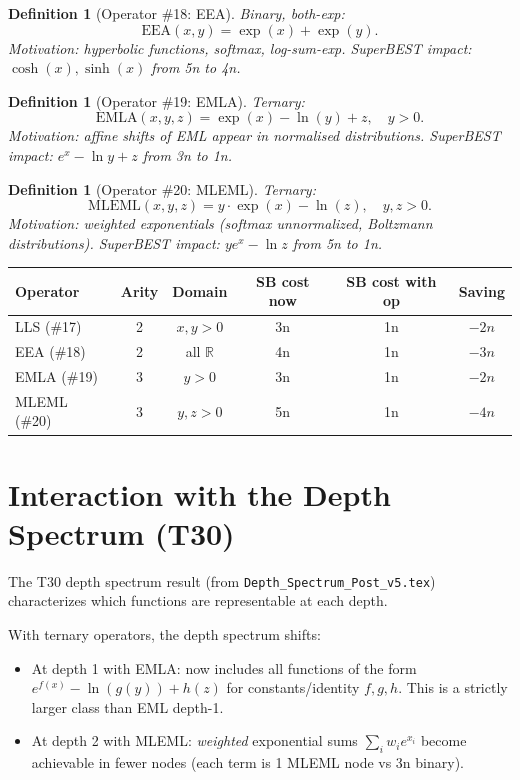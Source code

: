 \documentclass[11pt]{article}
\newtheorem{definition}[theorem]{Definition}
\begin{document}
\begin{definition}[Operator \#18: EEA]
Binary, both-exp:
\[
  \mathrm{EEA}(x,y) = \exp(x) + \exp(y).
\]
Motivation: hyperbolic functions, softmax, log-sum-exp.
SuperBEST impact: $\cosh(x), \sinh(x)$ from 5n to 4n.
\end{definition}

\begin{definition}[Operator \#19: EMLA]
Ternary:
\[
  \mathrm{EMLA}(x,y,z) = \exp(x) - \ln(y) + z, \quad y > 0.
\]
Motivation: affine shifts of EML appear in normalised distributions.
SuperBEST impact: $e^x - \ln y + z$ from 3n to 1n.
\end{definition}

\begin{definition}[Operator \#20: MLEML]
Ternary:
\[
  \mathrm{MLEML}(x,y,z) = y \cdot \exp(x) - \ln(z), \quad y,z > 0.
\]
Motivation: weighted exponentials (softmax unnormalized, Boltzmann distributions).
SuperBEST impact: $y e^x - \ln z$ from 5n to 1n.
\end{definition}

\begin{center}
\begin{tabular}{lccccc}
\toprule
Operator & Arity & Domain & SB cost now & SB cost with op & Saving \\
\midrule
LLS (\#17)   & 2 & $x,y>0$ & 3n & 1n & $-2n$ \\
EEA (\#18)   & 2 & all $\mathbb{R}$ & 4n & 1n & $-3n$ \\
EMLA (\#19)  & 3 & $y>0$ & 3n & 1n & $-2n$ \\
MLEML (\#20) & 3 & $y,z>0$ & 5n & 1n & $-4n$ \\
\bottomrule
\end{tabular}
\end{center}

\section{Interaction with the Depth Spectrum (T30)}
\label{sec:t30}

The T30 depth spectrum result (from \texttt{Depth\_Spectrum\_Post\_v5.tex})
characterizes which functions are representable at each depth.

With ternary operators, the depth spectrum shifts:
\begin{itemize}
  \item At depth 1 with EMLA: now includes all functions of the form
        $e^{f(x)} - \ln(g(y)) + h(z)$ for constants/identity $f,g,h$.
        This is a strictly larger class than EML depth-1.
  \item At depth 2 with MLEML: \emph{weighted} exponential sums
        $\sum_i w_i e^{x_i}$ become achievable in fewer nodes
        (each term is 1 MLEML node vs 3n binary).
\end{itemize}
\end{document}
